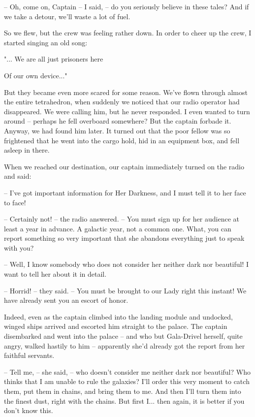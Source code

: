 \documentclass[ebook,twoside,final,openright]{memoir}
\begin{document}
– Oh, come on, Captain – I said, – do you seriously believe in these tales? And if we take a detour, we’ll waste a lot of fuel.\par
\par
So we flew, but the crew was feeling rather down. In order to cheer up the crew, I started singing an old song: \par
 "... We are all just prisoners here \par
 Of our own device..." \par
 But they became even more scared for some reason. We’ve flown through almost the entire tetrahedron, when suddenly we noticed that our radio operator had disappeared. We were calling him, but he never responded. I even wanted to turn around – perhaps he fell overboard somewhere? But the captain forbade it. Anyway, we had found him later. It turned out that the poor fellow was so frightened that he went into the cargo hold, hid in an equipment box, and fell asleep in there.\par
\par
When we reached our destination, our captain immediately turned on the radio and said:\par
– I've got important information for Her Darkness, and I must tell it to her face to face!\par
– Certainly not! – the radio answered. – You must sign up for her audience at least a year in advance. A galactic year, not a common one. What, you can report something so very important that she abandons everything just to speak with you?\par
– Well, I know somebody who does not consider her neither dark nor beautiful! I want to tell her about it in detail.\par
– Horrid! – they said. – You must be brought to our Lady right this instant! We have already sent you an escort of honor.\par
\par
Indeed, even as the captain climbed into the landing module and undocked, winged ships arrived and escorted him straight to the palace. The captain disembarked and went into the palace – and who but Gala-Drivel herself, quite angry, walked hastily to him – apparently she’d already got the report from her faithful servants.\par
– Tell me, – she said, – who doesn’t consider me neither dark nor beautiful? Who thinks that I am unable to rule the galaxies? I’ll order this very moment to catch them, put them in chains, and bring them to me. And then I’ll turn them into the finest dust, right with the chains. But first I... then again, it is better if you don’t know this.\par
\end{document}
